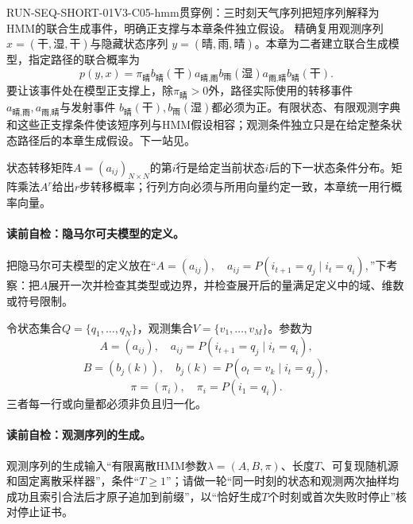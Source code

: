 \begin{SLRunningExample}{RUN-SEQ-SHORT-01}{V3-C05-hmm}{贯穿例：三时刻天气序列}{把短序列解释为HMM的联合生成事件，明确正支撑与本章条件独立假设。}
精确复用观测序列$x=(\text{干},\text{湿},\text{干})$与隐藏状态序列
$y=(\text{晴},\text{雨},\text{晴})$。本章为二者建立联合生成模型，指定路径的联合概率为
\[
p(y,x)=\pi_{\text{晴}}b_{\text{晴}}(\text{干})
a_{\text{晴},\text{雨}}b_{\text{雨}}(\text{湿})
a_{\text{雨},\text{晴}}b_{\text{晴}}(\text{干}).
\]
要让该事件处在模型正支撑上，除$\pi_{\text{晴}}>0$外，路径实际使用的转移事件
$a_{\text{晴},\text{雨}},a_{\text{雨},\text{晴}}$与发射事件
$b_{\text{晴}}(\text{干}),b_{\text{雨}}(\text{湿})$都必须为正。有限状态、有限观测字典和这些正支撑条件使该短序列与HMM假设相容；观测条件独立只是在给定整条状态路径后的本章生成假设。下一站见。
\end{SLRunningExample}


状态转移矩阵$A=(a_{ij})_{N\times N}$的第$i$行是给定当前状态$i$后的下一状态条件分布。矩阵乘法$A^r$给出$r$步转移概率；行列方向必须与所用向量约定一致，本章统一用行概率向量。

\paragraph{读前自检：隐马尔可夫模型的定义。}把隐马尔可夫模型的定义放在“$A=(a_{ij}),\quad a_{ij}=P(i_{t+1}=q_j\mid i_t=q_i),$”下考察：把$A$展开一次并检查其类型或边界，并检查展开后的量满足定义中的域、维数或符号限制。\par

令状态集合$Q=\{q_1,\ldots,q_N\}$，观测集合$V=\{v_1,\ldots,v_M\}$。参数为
\[
A=(a_{ij}),\quad a_{ij}=P(i_{t+1}=q_j\mid i_t=q_i),
\]
\[
B=(b_j(k)),\quad b_j(k)=P(o_t=v_k\mid i_t=q_j),
\]
\[
\pi=(\pi_i),\quad \pi_i=P(i_1=q_i).
\]
三者每一行或向量都必须非负且归一化。

\paragraph{读前自检：观测序列的生成。}观测序列的生成输入“有限离散HMM参数$\lambda=(A,B,\pi)$、长度$T$、可复现随机源和固定离散采样器”，条件“$T\ge1$”；请做一轮“同一时刻的状态和观测两次抽样均成功且索引合法后才原子追加到前缀”，以“恰好生成$T$个时刻或首次失败时停止”核对停止证书。\par
